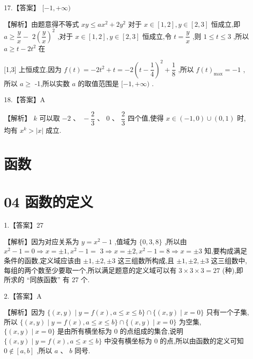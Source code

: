 \documentclass[10pt]{article}
\begin{document}
17.【答案】 $\lbrack  - 1, + \infty )$

【解析】由题意得不等式 ${xy} \leq  a{x}^{2} + 2{y}^{2}$ 对于 $x \in  \left\lbrack  {1,2}\right\rbrack  ,y \in  \left\lbrack  {2,3}\right\rbrack$ 恒成立,即 $a \geq  \dfrac{y}{x} -$  $2{\left( \dfrac{y}{x}\right) }^{2}$ ,对于 $x \in  \left\lbrack  {1,2}\right\rbrack  ,y \in  \left\lbrack  {2,3}\right\rbrack$ 恒成立,令 $t = \dfrac{y}{x}$ ,则 $1 \leq  t \leq  3$ ,所以 $a \geq  t - 2{t}^{2}$ 在

[1,3] 上恒成立,因为 $f\left( t\right)  =  - 2{t}^{2} + t =  - 2{\left( t - \dfrac{1}{4}\right) }^{2} + \dfrac{1}{8}$ ,所以 $f{\left( t\right) }_{\max } =  - 1$ ,所以 $a \geq$ -1,所以实数 $a$ 的取值范围是 $\lbrack  - 1, + \infty )$ .

18.【答案】A

【解析】 $k$ 可以取 $- 2\text{ 、 } - \dfrac{2}{3}\text{ 、 }0\text{ 、 }\dfrac{2}{3}$ 四个值,使得 $x \in  \left( {-1,0}\right)  \cup  \left( {0,1}\right)$ 时,均有 ${x}^{k} > \left| x\right|$ 成立.

\section*{函数}

\section*{04 函数的定义}

1.【答案】27

【解析】因为对应关系为 $y = {x}^{2} - 1$ ,值域为 $\{ 0,3,8\}$ ,所以由 ${x}^{2} - 1 = 0 \Rightarrow  x =  \pm  1,{x}^{2} - 1 =$  $3 \Rightarrow  x =  \pm  2,{x}^{2} - 1 = 8 \Rightarrow  x =  \pm  3$ 知,要构成满足条件的函数,定义域应该由 $\pm  1, \pm  2, \pm  3$ 这三组数所构成,且 $\pm  1, \pm  2, \pm  3$ 这三组数中,每组的两个数至少要取一个,所以满足题意的定义域可以有 $3 \times  3 \times  3 = {27}$ (种),即所求的 “同族函数” 有 27 个.

2.【答案】A

【解析】因为 $\{ \left( {x,y}\right)  \mid  y = f\left( x\right) ,a \leq  x \leq  b\}  \cap  \{ \left( {x,y}\right)  \mid  x = 0\}$ 只有一个子集,所以 $\{ \left( {x,y}\right)  \mid  y = f\left( x\right) ,a \leq  x \leq  b\}  \cap  \{ \left( {x,y}\right)  \mid  x = 0\}$ 为空集, $\{ \left( {x,y}\right)  \mid  x = 0\}$ 是由所有横坐标为 0 的点组成的集合,说明 $\{ \left( {x,y}\right)  \mid  y = f\left( x\right) ,a \leq  x \leq  b\}$ 中没有横坐标为 0 的点,所以由函数的定义可知 $0 \notin  \left\lbrack  {a,b}\right\rbrack$ ,所以 $a\text{ 、 }b$ 同号.
\end{document}
